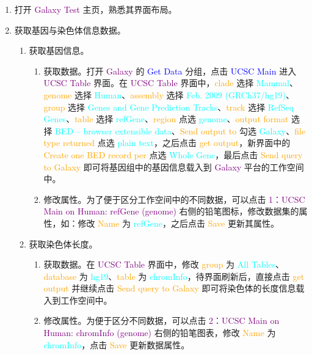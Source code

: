 \begin{description}
\begin{enumerate}
			\item 打开 \textcolor{purple}{Galaxy Test} 主页，熟悉其界面布局。
			\item 获取基因与染色体信息数据。
				\begin{enumerate}
					\item 获取基因信息。
						\begin{enumerate}
							\item 获取数据。打开 \textcolor{purple}{Galaxy} 的 \textcolor{blue}{Get Data} 分组，点击 \textcolor{blue}{UCSC Main} 进入 \textcolor{purple}{UCSC Table} 界面。在 \textcolor{purple}{UCSC Table} 界面中，\textcolor{orange}{clade} 选择 \textcolor{cyan}{Mammal}、\textcolor{orange}{genome} 选择 \textcolor{cyan}{Human}、\textcolor{orange}{assembly} 选择 \textcolor{cyan}{Feb. 2009 (GRCh37/hg19)}、\textcolor{orange}{group} 选择 \textcolor{cyan}{Genes and Gene Prediction Tracks}、\textcolor{orange}{track} 选择 \textcolor{cyan}{RefSeq Genes}、\textcolor{orange}{table} 选择 \textcolor{cyan}{refGene}、\textcolor{orange}{region} 点选 \textcolor{cyan}{genome}、\textcolor{orange}{output format} 选择 \textcolor{cyan}{BED – browser extensible data}、\textcolor{orange}{Send output to} 勾选 \textcolor{cyan}{Galaxy}、\textcolor{orange}{file type returned} 点选 \textcolor{cyan}{plain text}，之后点击 \textcolor{orange}{get output}，新界面中的 \textcolor{orange}{Create one BED record per} 点选 \textcolor{cyan}{Whole Gene}，最后点击 \textcolor{orange}{Send query to Galaxy} 即可将基因组中的基因信息载入到 \textcolor{purple}{Galaxy} 平台的工作空间中。
							\item 修改属性。为了便于区分工作空间中的不同数据，可以点击 \textcolor{purple}{1：UCSC Main on Human: refGene (genome)} 右侧的铅笔图标，修改数据集的属性，如：修改 \textcolor{orange}{Name} 为 \textcolor{cyan}{refGene}，之后点击 \textcolor{orange}{Save} 更新其属性。
						\end{enumerate}
					\item 获取染色体长度。
						\begin{enumerate}
							\item 获取数据。在 \textcolor{purple}{UCSC Table} 界面中，修改 \textcolor{orange}{group} 为 \textcolor{cyan}{All Tables}、\textcolor{orange}{database} 为 \textcolor{cyan}{hg19}、\textcolor{orange}{table} 为 \textcolor{cyan}{chromInfo}，待界面刷新后，直接点击 \textcolor{orange}{get output} 并继续点击 \textcolor{orange}{Send query to Galaxy} 即可将染色体的长度信息载入到工作空间中。
							\item 修改属性。为便于区分不同数据，可以点击 \textcolor{purple}{2：UCSC Main on Human: chromInfo (genome)} 右侧的铅笔图表，修改 \textcolor{orange}{Name} 为 \textcolor{cyan}{chromInfo}，点击 \textcolor{orange}{Save} 更新数据属性。

\end{enumerate}
\end{enumerate}
\end{enumerate}
\end{description}
